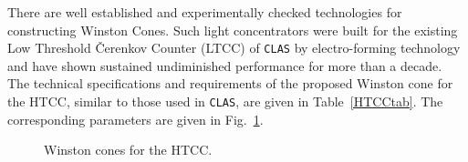 There are well established and experimentally checked technologies for 
constructing Winston Cones.  Such light concentrators were built for the 
existing Low Threshold {\v C}erenkov Counter (LTCC) of {\tt CLAS} by 
electro-forming technology and have shown sustained undiminished 
performance for more than a decade.  The technical specifications and 
requirements of the proposed Winston cone for the HTCC, similar to those 
used in {\tt CLAS}, are given in Table~\ref{HTCCtab}.  The corresponding 
parameters are given in Fig.~\ref{Winston}.

\begin{figure}
\begin{center}
\caption{\small{Winston cones for the HTCC.}}
\label{Winston}
\end{center}
\end{figure}

